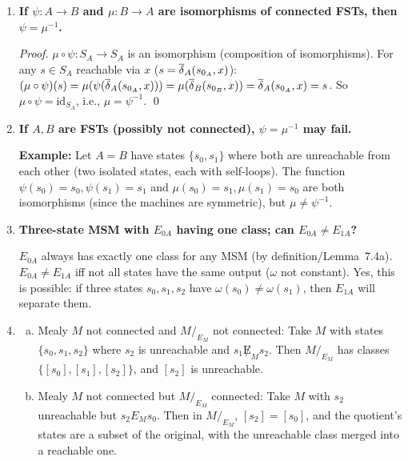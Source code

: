 \begin{enumerate}[{7.}1.]
\begin{enumerate}[(a)]
  \item Same for Moore.
\end{enumerate}

\item \textbf{If $\psi:A\to B$ and $\mu:B\to A$ are isomorphisms of connected FSTs, then $\psi=\mu^{-1}$.}

\begin{proof}
$\mu\circ\psi:S_A\to S_A$ is an isomorphism (composition of isomorphisms).  For any $s\in S_A$ reachable via $x$ ($s=\overline{\delta}_A(s_{0_A},x)$): $(\mu\circ\psi)(s)=\mu(\psi(\overline{\delta}_A(s_{0_A},x)))=\mu(\overline{\delta}_B(s_{0_B},x))=\overline{\delta}_A(s_{0_A},x)=s$.  So $\mu\circ\psi=\text{id}_{S_A}$, i.e., $\mu=\psi^{-1}$. \qed
\end{proof}

\item \textbf{If $A,B$ are FSTs (possibly not connected), $\psi=\mu^{-1}$ may fail.}

\textbf{Example:} Let $A=B$ have states $\{s_0,s_1\}$ where both are unreachable from each other (two isolated states, each with self-loops).  The function $\psi(s_0)=s_0,\psi(s_1)=s_1$ and $\mu(s_0)=s_1,\mu(s_1)=s_0$ are both isomorphisms (since the machines are symmetric), but $\mu\neq\psi^{-1}$.

\item \textbf{Three-state MSM with $E_{0A}$ having one class; can $E_{0A}\neq E_{1A}$?}

$E_{0A}$ always has exactly one class for any MSM (by definition/Lemma~7.4a).  $E_{0A}\neq E_{1A}$ iff not all states have the same output ($\omega$ not constant).  Yes, this is possible: if three states $s_0,s_1,s_2$ have $\omega(s_0)\neq\omega(s_1)$, then $E_{1A}$ will separate them.

\item \begin{enumerate}[(a)]
  \item Mealy $M$ not connected and $M/_{E_M}$ not connected: Take $M$ with states $\{s_0,s_1,s_2\}$ where $s_2$ is unreachable and $s_1\not E_M s_2$.  Then $M/_{E_M}$ has classes $\{[s_0],[s_1],[s_2]\}$, and $[s_2]$ is unreachable.

  \item Mealy $M$ not connected but $M/_{E_M}$ connected: Take $M$ with $s_2$ unreachable but $s_2 E_M s_0$.  Then in $M/_{E_M}$, $[s_2]=[s_0]$, and the quotient's states are a subset of the original, with the unreachable class merged into a reachable one.
\end{enumerate}


\end{enumerate}
